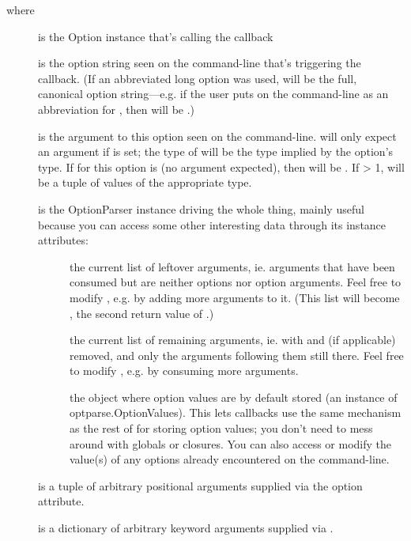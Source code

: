 where
\begin{description}
\item[]
is the Option instance that's calling the callback
\item[]
is the option string seen on the command-line that's triggering the
callback.  (If an abbreviated long option was used,  will
be the full, canonical option string{---}e.g. if the user puts
 on the command-line as an abbreviation for
, then  will be .)
\item[]
is the argument to this option seen on the command-line.   will
only expect an argument if  is set; the type of 
will be the type implied by the option's type.  If  for this
option is  (no argument expected), then  will be
.  If  {\textgreater} 1,  will be a tuple of values of
the appropriate type.
\item[]
is the OptionParser instance driving the whole thing, mainly
useful because you can access some other interesting data through
its instance attributes:
\begin{description}
\item[]
the current list of leftover arguments, ie. arguments that have
been consumed but are neither options nor option arguments.
Feel free to modify , e.g. by adding more
arguments to it.  (This list will become , the second
return value of .)
\item[]
the current list of remaining arguments, ie. with  and
 (if applicable) removed, and only the arguments
following them still there.  Feel free to modify
, e.g. by consuming more arguments.
\item[]
the object where option values are by default stored (an
instance of optparse.OptionValues).  This lets callbacks use the
same mechanism as the rest of  for storing option values;
you don't need to mess around with globals or closures.  You can
also access or modify the value(s) of any options already
encountered on the command-line.
\end{description}
\item[]
is a tuple of arbitrary positional arguments supplied via the
 option attribute.
\item[]
is a dictionary of arbitrary keyword arguments supplied via
.
\end{description}


